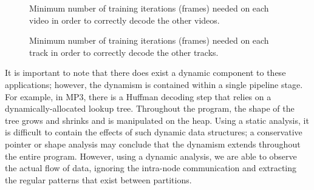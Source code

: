 \begin{figure}[t]
\begin{minipage}{3.075in}
\vspace{-12pt}
\caption[Training needed for correct parallelization of
  MPEG-2]{Minimum number of training iterations (frames) needed on
  each video in order to correctly decode the other videos.
  \protect\label{tab:mpeg2-matrix}}
\end{minipage}
\hspace{0.3in}
\begin{minipage}{3.02in}
\vspace{-12pt}
\caption[Training needed for correct parallelization of MP3]{Minimum
  number of training iterations (frames) needed on each track in order
  to correctly decode the other tracks.
  \protect\label{tab:mp3-matrix}}
\end{minipage}
\end{figure}

It is important to note that there does exist a dynamic component to
these applications; however, the dynamism is contained within a single
pipeline stage.  For example, in MP3, there is a Huffman decoding step
that relies on a dynamically-allocated lookup tree.  Throughout the
program, the shape of the tree grows and shrinks and is manipulated on
the heap.  Using a static analysis, it is difficult to contain the
effects of such dynamic data structures; a conservative pointer or
shape analysis may conclude that the dynamism extends throughout the
entire program.  However, using a dynamic analysis, we are able to
observe the actual flow of data, ignoring the intra-node communication
and extracting the regular patterns that exist between partitions.



